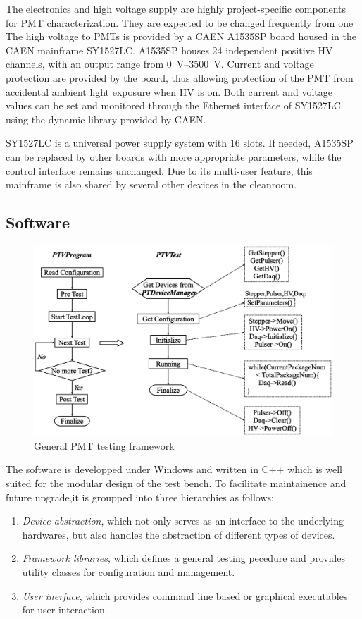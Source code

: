 \documentclass[5p, times]{elsarticle}
\begin{document}
The electronics and high voltage supply are highly project-specific components for PMT characterization.
They are expected to be changed frequently from one 
The high voltage to PMTs is provided by a CAEN A1535SP board housed in the CAEN mainframe SY1527LC. 
A1535SP houses 24 independent positive HV channels, with an output range from \SIrange{0}{3500}{\volt}.
Current and voltage protection are provided by the board, thus allowing protection of the PMT from accidental ambient light exposure when HV is on.
Both current and voltage values can be set and monitored through the Ethernet interface of SY1527LC using the dynamic library provided by CAEN.

SY1527LC is a universal power supply system with 16 slots.
If needed, A1535SP can be replaced by other boards with more appropriate parameters, while the control interface remains unchanged.
Due to its multi-user feature, this mainframe is also shared by several other devices in the cleanroom.

\subsection{Software}
\label{sec:software}

\begin{figure}[b]
\centering
 \includegraphics[width=140mm]{software_framework}
\caption{General PMT testing framework}
\label{fig:software_framework}
\end{figure}

The software is developped under Windows and written in C++ which is well suited for the modular design of the test bench.
To facilitate maintainence and future upgrade,it is groupped into three hierarchies as follows:
\begin{enumerate}
 \item \textit{Device abstraction}, which not only serves as an interface to the underlying hardwares, but also handles the abstraction of different types of devices. 
 \item \textit{Framework libraries}, which defines a general testing pecedure and provides utility classes for configuration and management.
 \item \textit{User inerface}, which provides command line based or graphical executables for user interaction. 
\end{enumerate}
\end{document}
